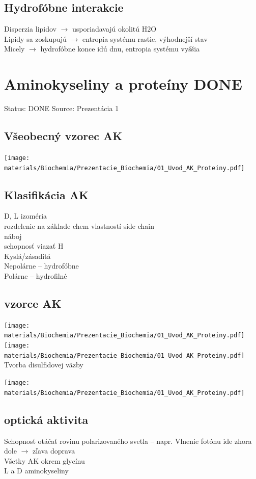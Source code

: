 \subsection*{Hydrofóbne interakcie}
Disperzia lipidov $\rightarrow$ usporiadavajú okolitú H2O\\
Lipidy sa zoskupujú $\rightarrow$ entropia systému rastie, výhodnejší stav\\
Micely $\rightarrow$ hydrofóbne konce idú dnu, entropia systému vyššia\\

\section{Aminokyseliny a proteíny DONE}

Status: DONE
Source: Prezentácia 1
\\
\subsection*{Všeobecný vzorec AK}
\texttt{[image: materials/Biochemia/Prezentacie\_Biochemia/01\_Uvod\_AK\_Proteiny.pdf]}
\subsection*{Klasifikácia AK}
D, L izoméria\\
rozdelenie na základe chem vlastností side chain\\
\tab náboj\\
\tab schopnosť viazať H\\
\tab Kyslá/zásaditá\\
Nepolárne -- hydrofóbne\\
Polárne -- hydrofilné
\subsection*{vzorce AK}
\texttt{[image: materials/Biochemia/Prezentacie\_Biochemia/01\_Uvod\_AK\_Proteiny.pdf]}
\texttt{[image: materials/Biochemia/Prezentacie\_Biochemia/01\_Uvod\_AK\_Proteiny.pdf]}
\\
Tvorba disulfidovej väzby

\texttt{[image: materials/Biochemia/Prezentacie\_Biochemia/01\_Uvod\_AK\_Proteiny.pdf]}
\\
\subsection*{optická aktivita}
Schopnosť otáčať rovinu polarizovaného svetla -- napr. Vlnenie fotónu ide zhora dole $\rightarrow$ zľava doprava\\
Všetky AK okrem glycínu\\
L a D aminokyseliny \\

